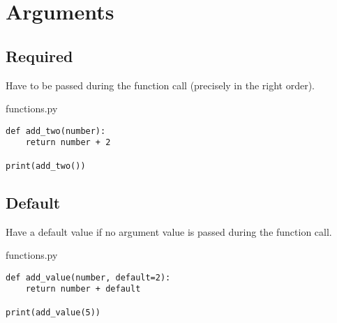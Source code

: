 \documentclass[aspectratio=1610,slidestop]{beamer}
\begin{document}
\section{Arguments}

\subsection{Required}
\begin{pframe}
  Have to be passed during the function call (precisely in the right order).
 \begin{pythonfile}{functions.py}
  \begin{verbatim}
def add_two(number):
    return number + 2

print(add_two())
  \end{verbatim}
 \end{pythonfile}
 \pause
 \begin{terminal}
 \end{terminal}
\end{pframe}


\subsection{Default}
\begin{pframe}
 Have a default value if no argument value is passed during the function call.
 \medskip

 \begin{minipage}[t]{0.47\textwidth}
  \begin{pythonfile}{functions.py}
   \begin{verbatim}
def add_value(number, default=2):
    return number + default

print(add_value(5))
   \end{verbatim}
  \end{pythonfile}
 \end{minipage}\qquad
 \begin{minipage}[t]{0.47\textwidth}
  \vspace{-2.6cm}
  \begin{terminal}
  \end{terminal}
 \end{minipage}
\end{pframe}
\end{document}
